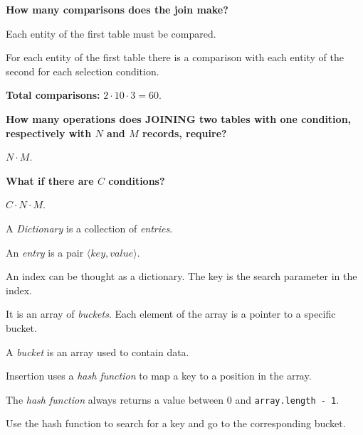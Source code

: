 \documentclass{beamer}
\begin{document}
\begin{slide}{
\item \textbf{How many comparisons does the join make?}
\pause
\item Each entity of the first table must be compared.
\item For each entity of the first table there is a comparison with each entity of the second for each selection condition.
\item \textbf{Total comparisons: }$2 \cdot 10 \cdot 3 = 60$.
\item \textbf{How many operations does JOINING two tables with one condition, respectively with $N$ and $M$ records, require?}
\pause
\item $N \cdot M$.
\item \textbf{What if there are $C$ conditions?}
\pause
\item $C \cdot N \cdot M$.
}\end{slide}

\begin{slide}{
\item A \textit{Dictionary} is a collection of \textit{entries}.
\item An \textit{entry} is a pair $\langle key,value \rangle$.
\item An index can be thought as a dictionary. The key is the search parameter in the index.
}\end{slide}

\begin{slide}{
\item It is an array of \textit{buckets}. Each element of the array is a pointer to a specific bucket.
\item A \textit{bucket} is an array used to contain data.
\item Insertion uses a \textit{hash function} to map a key to a position in the array.
\item The \textit{hash function} always returns a value between 0 and \texttt{array.length - 1}.
\item Use the hash function to search for a key and go to the corresponding bucket.
}\end{slide}
\end{document}
